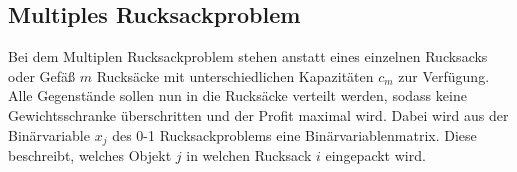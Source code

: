 \subsection{Multiples Rucksackproblem}
Bei dem Multiplen Rucksackproblem stehen anstatt eines einzelnen Rucksacks oder Gefäß $m$ Rucksäcke mit unterschiedlichen Kapazitäten $c_m$ zur Verfügung. Alle Gegenstände sollen nun in die Rucksäcke verteilt werden, sodass keine Gewichtsschranke überschritten und der Profit maximal wird. Dabei wird aus der Binärvariable $x_j$ des 0-1 Rucksackproblems eine Binärvariablenmatrix. Diese beschreibt, welches Objekt $j$ in welchen Rucksack $i$ eingepackt wird. \cite[vgl.][]{Martello1990}
